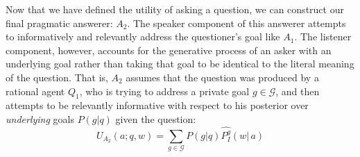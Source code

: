 \documentclass[12pt, floatsintext, jou]{apa6}
\begin{document}
%


Now that we have defined the utility of asking a question, we can construct our final pragmatic answerer: $A_2$. The speaker component of this answerer attempts to informatively and relevantly address the questioner's goal like $A_1$. The listener component, however, accounts for the generative process of an asker with an underlying goal rather than taking that goal to be identical to the literal meaning of the question. That is, $A_2$ assumes that the question was produced by a rational agent $Q_1$, who is trying to address a private goal $g \in \mathcal{G}$, and then attempts to be relevantly informative with respect to his posterior over \emph{underlying} goals $P(g|q)$ given the question:
\begin{equation}
U_{A_2}(a; q, w) = \sum_{g \in \mathcal{G}} P(g|q) \widehat{P^g_I}(w|\,a)
\end{equation}
\end{document}
